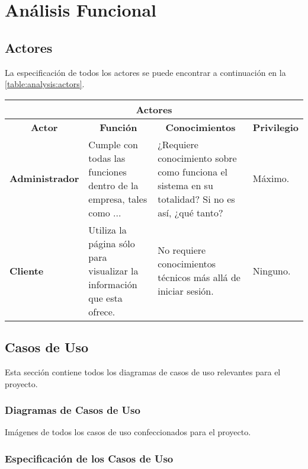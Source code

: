 \chapter{Análisis Funcional}

\section{Actores}
\label{analysis:actors}

La especificación de todos los actores se puede encontrar a continuación en la \autoref{table:analysis:actors}.

\begin{center}
  \begin{tabular}{| p{3cm} | p{4.5cm} | p{4.5cm} | p{2cm} |}
    \hline
    \multicolumn{4}{|c|}{\textbf{Actores}} \\
    \hline
    \multicolumn{1}{|c|}{\textbf{Actor}} & \multicolumn{1}{|c|}{\textbf{Función}} & \multicolumn{1}{|c|}{\textbf{Conocimientos}} & \multicolumn{1}{|c|}{\textbf{Privilegio}}\\
    \hline
    {\textbf{Administrador}} & Cumple con todas las funciones dentro de la empresa, tales como ... & ¿Requiere conocimiento sobre como funciona el sistema en su totalidad? Si no es así, ¿qué tanto? & Máximo. \\ \hline
    {\textbf{Cliente}} & Utiliza la página sólo para visualizar la información que esta ofrece. & No requiere conocimientos técnicos más allá de iniciar sesión. & Ninguno.\\ \hline
  \end{tabular}
  \label{table:analysis:actors}
\end{center}

\section{Casos de Uso}
Esta sección contiene todos los diagramas de casos de uso relevantes para el proyecto.

\subsection{Diagramas de Casos de Uso}
Imágenes de todos los casos de uso confeccionados para el proyecto.

\subsection{Especificación de los Casos de Uso}

